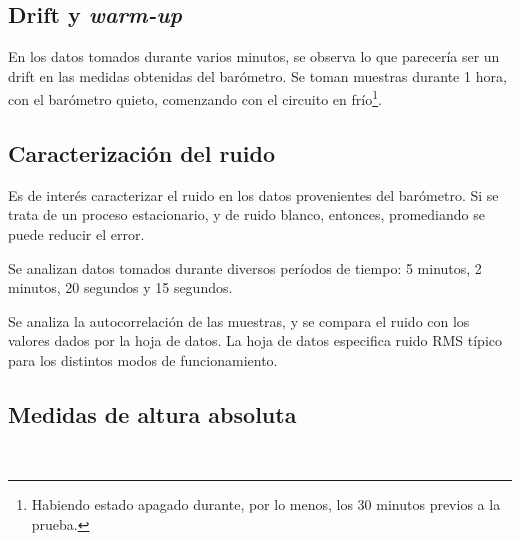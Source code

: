 \documentclass[main]{subfiles}
\begin{document}
\subsection{Drift y \textit{warm-up}}
\label{sec:drift-y-warm-up}

En los datos tomados durante varios minutos, se observa lo que parecería ser un drift en las medidas obtenidas del barómetro. Se toman muestras durante 1 hora, con el barómetro quieto, comenzando con el circuito en frío\footnote{Habiendo estado apagado durante, por lo menos, los 30 minutos previos a la prueba.}.

\subsection{Caracterización del ruido}

Es de interés caracterizar el ruido en los datos provenientes del barómetro. Si se trata de un proceso estacionario, y de ruido blanco, entonces, promediando se puede reducir el error.

Se analizan datos tomados durante diversos períodos de tiempo: 5 minutos, 2 minutos, 20 segundos y 15 segundos.

Se analiza la autocorrelación de las muestras, y se compara el ruido con los valores dados por la hoja de datos. La hoja de datos especifica ruido RMS típico para los distintos modos de funcionamiento.

\subsection{Medidas de altura absoluta}

\begin{figure}
\vspace{-70pt}
  \begin{center}
	\\
  \end{center}
\vspace{-15pt}
  \caption{}
\label{fig:escalera-fing}
\vspace{-40pt}
\end{figure}
\end{document}

